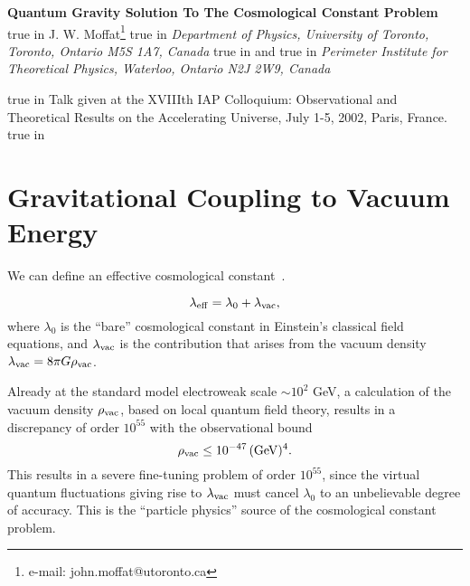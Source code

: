 \documentclass[a4paper,11pt]{article}
\begin{document}
\pagestyle{plain}
\setcounter{page}{1}
\begin{center}
{\large\bf Quantum Gravity Solution To The Cosmological Constant
Problem}
 true in {\large J. W. Moffat}\footnote{e-mail:
john.moffat@utoronto.ca}   true in {\it Department of
Physics, University of Toronto, Toronto, Ontario M5S 1A7,
Canada}  true in and  true in {\it Perimeter
Institute for Theoretical Physics, Waterloo, Ontario N2J 2W9,
Canada}
\date{\today}
\begin{abstract}%
A nonlocal quantum gravity theory is presented which is finite and unitary
to all orders of perturbation theory. Vertex form factors in Feynman
diagrams involving gravitons suppress graviton and matter vacuum
fluctuation loops by introducing a low-energy gravitational scale,
$\Lambda_{\rm Gvac} < 2.4\times 10^{-3}$ eV. Gravitons coupled to
non-vacuum matter loops and matter tree graphs are controlled by a vertex
form factor with the energy scale, $\Lambda_{GM}< 1-10$ TeV.
\end{abstract}

\end{center}
 true in
Talk given at the XVIIIth IAP Colloquium: Observational and
Theoretical Results on the Accelerating Universe, July 1-5, 2002,
Paris, France.
 true in

\section{\bf Gravitational Coupling to Vacuum Energy}

We can define an effective cosmological constant~\cite{Straumann}.

\begin{equation}
\lambda_{\rm eff}=\lambda_0+\lambda_{\rm vac},
\end{equation}
where $\lambda_0$ is the ``bare'' cosmological
constant in Einstein's classical field equations,
and $\lambda_{\rm vac}$ is the contribution that arises from the
vacuum density $\lambda_{\rm vac}=8\pi G\rho_{\rm vac}$.

Already at the standard model electroweak scale $\sim 10^2$ GeV, a
calculation of the vacuum density $\rho_{\rm vac}$, based on local quantum field
theory, results in a discrepancy of order $10^{55}$ with the observational
bound
\begin{equation}
\label{vacbound}
\rho_{\rm vac} \leq 10^{-47}\, ({\rm GeV})^4.
\end{equation}
This results in a severe fine-tuning problem of order $10^{55}$,
since the virtual quantum fluctuations giving rise to $\lambda_{\rm vac}$
must cancel $\lambda_0$ to an unbelievable degree of accuracy.
This is the ``particle physics'' source of the cosmological
constant problem.
\end{document}
